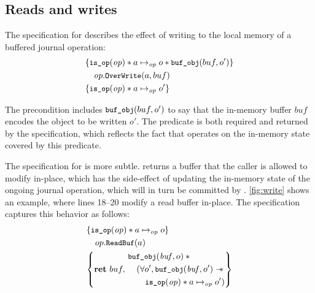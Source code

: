 
\subsection{Reads and writes}
\label{s:design:read-write}

The specification for  describes the effect of writing to the
local memory of a buffered journal operation:
%
\begin{align*}
  \hoareV{\cc{is_op}(\mathit{op}) \sep a \mapsto_{\mathit{op}} o \sep \cc{buf_obj}(buf, o')}%
        {\mathit{op}.\cc{OverWrite}(a, buf)}%
        {\cc{is_op}(\mathit{op}) \sep a \mapsto_{\mathit{op}} o'}
\end{align*}

The precondition includes $\cc{buf_obj}(buf, o')$ to say that the in-memory
buffer $buf$ encodes the object to be written $o'$.
The  predicate is both
required and returned by the specification, which reflects the fact that
 operates on the in-memory state covered by
this predicate.

The specification for  is more subtle.  
returns a buffer that the caller is allowed to modify in-place, which
has the side-effect of updating the in-memory state of the ongoing journal operation, which
will in turn be committed by .  \autoref{fig:write} shows
an example, where lines 18--20 modify a read buffer in-place.  The specification
captures this behavior as follows:
%
\begin{align*}
  \hoareV{\cc{is_op}(\mathit{op}) \sep a \mapsto_{\mathit{op}} o}%
        {op.\cc{ReadBuf}(a)}%
        {\Ret{buf}
  \begin{aligned}
  &\cc{buf_obj}(\mathit{buf}, o) \sep \phantom{} \\
  &\quad( \forall o', \cc{buf_obj}(\mathit{buf}, o') \wand \\
  &\quad\quad \cc{is_op}(\mathit{op}) \sep a \mapsto_{\mathit{op}} o' )
    \end{aligned}}
\end{align*}

